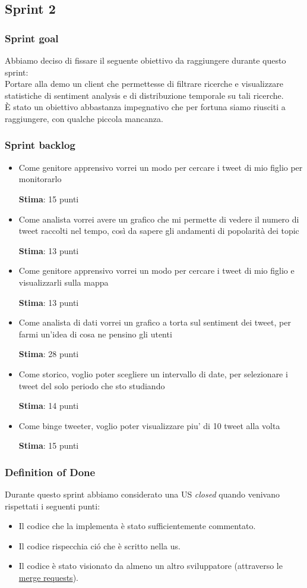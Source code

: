 \documentclass{article}
\begin{document}
\subsection{Sprint 2}
\subsubsection{Sprint goal}
Abbiamo deciso di fissare il seguente obiettivo da raggiungere durante questo sprint: \\
Portare alla demo un client che permettesse di filtrare ricerche e visualizzare statistiche di sentiment analysis e di distribuzione temporale su tali ricerche. \\
\`E stato un obiettivo abbastanza impegnativo che per fortuna siamo riusciti a raggiungere, con qualche piccola mancanza.
\subsubsection{Sprint backlog}
\begin{itemize}
    \item Come genitore apprensivo vorrei un modo per cercare i tweet di mio figlio per monitorarlo

    \textbf{Stima}: 15 punti
    \item Come analista vorrei avere un grafico che mi permette di vedere il numero di tweet raccolti nel tempo, così da sapere gli andamenti di popolarità dei topic

    \textbf{Stima}: 13 punti
    \item Come genitore apprensivo vorrei un modo per cercare i tweet di mio figlio e visualizzarli sulla mappa
    
    \textbf{Stima}: 13 punti
    \item Come analista di dati vorrei un grafico a torta sul sentiment dei tweet, per farmi un'idea di cosa ne pensino gli utenti
    
    \textbf{Stima}: 28 punti
     \item Come storico, voglio poter scegliere un intervallo di date, per selezionare i tweet del solo periodo che sto studiando
     
    \textbf{Stima}: 14 punti
    \item Come binge tweeter, voglio poter visualizzare piu' di 10 tweet alla volta
    
    \textbf{Stima}: 15 punti
\end{itemize}
\subsubsection{Definition of Done}
Durante questo sprint abbiamo considerato una US \textit{closed} quando venivano rispettati i seguenti punti: 
\begin{itemize}
    \item Il codice che la implementa è stato sufficientemente
commentato.
    \item Il codice rispecchia ció che è scritto nella us.
    \item Il codice è stato visionato da almeno un altro sviluppatore (attraverso le \href{https://docs.gitlab.com/ee/user/project/merge_requests/}{merge requests}).
\end{itemize}
\end{document}
